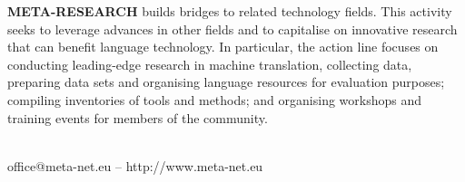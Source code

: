 \begin{multicols}{2}
\textbf{META-RESEARCH} builds bridges to related technology fields. This activity seeks to leverage advances in other fields and to capitalise on innovative research that can benefit language technology. In particular, the action line focuses on conducting leading-edge research in machine translation, collecting data, preparing data sets and organising language resources for evaluation purposes; compiling inventories of tools and methods; and organising workshops and training events for members of the community.\\\\

\centerline{office@meta-net.eu -- http://www.meta-net.eu}
\end{multicols}

\cleardoublepage

\appendix

%

  
%
%
  
\cleardoublepage

\label{metanetmembers}

